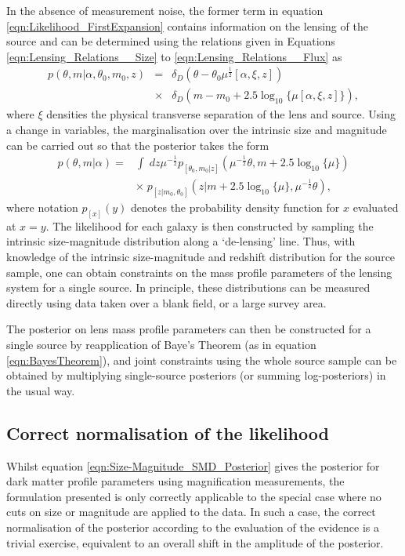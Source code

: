 \documentclass[useAMS,usenatbib,times,letter,amssymb]{mn2e}
\def\be{\begin{equation}}
\def\ee{\end{equation}}
\def\bea{\begin{eqnarray}}
\def\eea{\end{eqnarray}}
\begin{document}
In the absence of measurement noise, the former term in equation \ref{eqn:Likelihood_FirstExpansion} contains information on the lensing of the source and can be determined using the relations given in Equations \ref{eqn:Lensing_Relations__Size} to \ref{eqn:Lensing_Relations__Flux} as
\bea\label{eqn:Observed_Intrinsic_SizeMagnitude_Relation}
p(\theta, m|\alpha, \theta_0, m_0, z) &=& \delta_D(\theta - \theta_0\mu^{\frac{1}{2}}[\alpha,\xi,z])\\
&\times&\delta_D(m - m_0 +2.5\log_{10}\{\mu[\alpha,\xi,z]\}),\nonumber
\eea
where $\xi$ densities the physical transverse separation of the lens and source. Using a change in variables, the marginalisation over the intrinsic size and magnitude can be carried out so that the posterior takes the form
\be\label{eqn:Size-Magnitude_SMD_Posterior}
\begin{split}
p(\theta, m|\alpha) =  &\int \;dz \mu^{-\frac{1}{2}}p_{[\theta_0,m_0| z]}\left(\mu^{-\frac{1}{2}}\theta,m+2.5\log_{10}\{\mu\}\right)\\
& \times \; p_{[z|m_0, \theta_0]}(z| m+2.5\log_{10}\{\mu\}, \mu^{-\frac{1}{2}}\theta),
\end{split}
\ee
where notation $p_{[x]}(y)$ denotes the probability density function for $x$ evaluated at $x=y$. The likelihood for each galaxy is then constructed by sampling the intrinsic size-magnitude distribution along a `de-lensing' line. Thus, with knowledge of the intrinsic size-magnitude and redshift distribution for the source sample, one can obtain constraints on the mass profile parameters of the lensing system for a single source. In principle, these distributions can be measured directly using data taken over a blank field, or a large survey area. 

The posterior on lens mass profile parameters can then be constructed for a single source by reapplication of Baye's Theorem (as in equation \ref{eqn:BayesTheorem}), and joint constraints using the whole source sample can be obtained by multiplying single-source posteriors (or summing log-posteriors) in the usual way.

\subsection{Correct normalisation of the likelihood}

Whilst equation \ref{eqn:Size-Magnitude_SMD_Posterior} gives the posterior for dark matter profile parameters using magnification measurements, the formulation presented is only correctly applicable to the special case where no cuts on size or magnitude are applied to the data. In such a case, the correct normalisation of the posterior according to the evaluation of the evidence is a trivial exercise, equivalent to an overall shift in the amplitude of the posterior.
\end{document}
